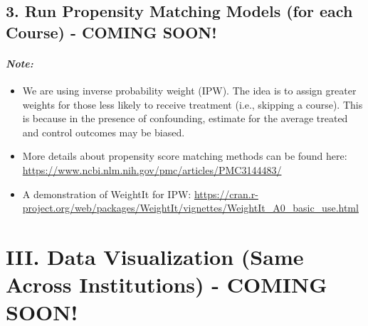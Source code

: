 \documentclass[]{article}
\providecommand{\tightlist}{%
  \setlength{\itemsep}{0pt}\setlength{\parskip}{0pt}}
\let\oldparagraph\paragraph
\renewcommand{\paragraph}[1]{\oldparagraph{#1}\mbox{}}
\begin{document}
\subsection{3. Run Propensity Matching Models (for each Course) - COMING
SOON!}\label{run-propensity-matching-models-for-each-course---coming-soon}

\paragraph{\texorpdfstring{\emph{Note:}}{Note:}}\label{note-11}

\begin{itemize}
\tightlist
\item
  We are using inverse probability weight (IPW). The idea is to assign
  greater weights for those less likely to receive treatment (i.e.,
  skipping a course). This is because in the presence of confounding,
  estimate for the average treated and control outcomes may be biased.
\item
  More details about propensity score matching methods can be found
  here: \url{https://www.ncbi.nlm.nih.gov/pmc/articles/PMC3144483/}
\item
  A demonstration of WeightIt for IPW:
  \url{https://cran.r-project.org/web/packages/WeightIt/vignettes/WeightIt_A0_basic_use.html}
\end{itemize}

\section{\texorpdfstring{\textbf{III. Data Visualization (Same Across
Institutions) - COMING
SOON!}}{III. Data Visualization (Same Across Institutions) - COMING SOON!}}\label{iii.-data-visualization-same-across-institutions---coming-soon}
\end{document}
